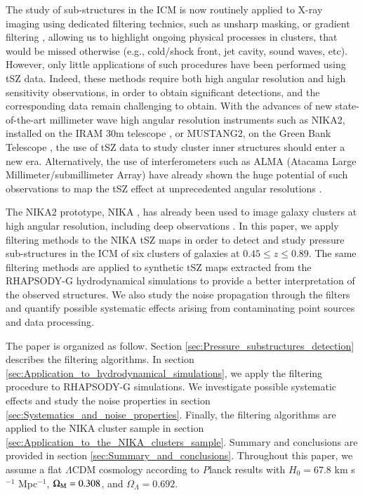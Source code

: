 \documentclass[twocolumn,traditabstract]{aa}
\begin{document}
The study of sub-structures in the ICM is now routinely applied to X-ray imaging using dedicated filtering technics, such as unsharp masking, or gradient filtering \citep[see, for example, recent results by][]{Sanders2016}, allowing us to highlight ongoing physical processes in clusters, that would be missed otherwise (e.g., cold/shock front, jet cavity, sound waves, etc). However, only little applications of such procedures have been performed using tSZ data. Indeed, these methods require both high angular resolution and high sensitivity observations, in order to obtain significant detections, and the corresponding data remain challenging to obtain. With the advances of new state-of-the-art millimeter wave high angular resolution instruments such as NIKA2, installed on the IRAM 30m telescope \citep[The New IRAM KIDs Array 2, $< 20$ arcsec resolution at 150 and 260 GHz,][]{Calvo2016,Catalano2016}, or MUSTANG2, on the Green Bank Telescope \citep[The MUltiplexed Squid Tes Array at Ninety Gigahertzh 2, $\sim 8$ arcsec at 90 GHz,][]{Dicker2014}, the use of tSZ data to study cluster inner structures should enter a new era. Alternatively, the use of interferometers such as ALMA (Atacama Large Millimeter/submillimeter Array) have already shown the huge potential of such observations to map the tSZ effect at unprecedented angular resolutions \citep{Kitayama2016}.

The NIKA2 prototype, NIKA \citep{Monfardini2011,Catalano2014}, has already been used to image galaxy clusters at high angular resolution, including deep observations \citep{Adam2014,Adam2015,Adam2016a,Adam2016b,Ruppin2016}. In this paper, we apply filtering methods to the NIKA tSZ maps in order to detect and study pressure sub-structures in the ICM of six clusters of galaxies at $0.45 \leq z \leq 0.89$. The same filtering methods are applied to synthetic tSZ maps extracted from the RHAPSODY-G hydrodynamical simulations \citep{Wu2013,Hahn2017} to provide a better interpretation of the observed structures. We also study the noise propagation through the filters and quantify possible systematic effects arising from contaminating point sources and data processing.

The paper is organized as follow. Section \ref{sec:Pressure_substructures_detection} describes the filtering algorithms. In section \ref{sec:Application_to_hydrodynamical_simulations}, we apply the filtering procedure to RHAPSODY-G simulations. We investigate possible systematic effects and study the noise properties in section \ref{sec:Systematics_and_noise_properties}. Finally, the filtering algorithms are applied to the NIKA cluster sample in section \ref{sec:Application_to_the_NIKA_clusters_sample}. Summary and conclusions are provided in section \ref{sec:Summary_and_conclusions}. Throughout this paper, we assume a flat $\Lambda$CDM cosmology according to {\textit Planck} results \citep{Planck2016XIII} with $H_0 = 67.8$ km s$^{-1}$ Mpc$^{-1}$, $\Omega_{\rm M} = 0.308$, and $\Omega_{\Lambda} = 0.692$.
\end{document}
